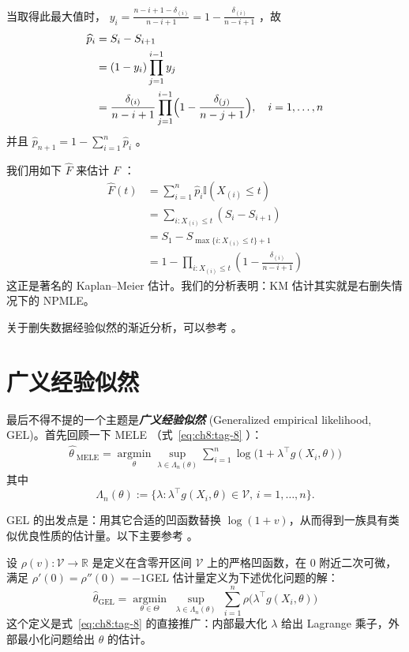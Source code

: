当取得此最大值时， $y_i=\frac{n-i+1-\delta_{(i)}}{n-i+1}=1-\frac{\delta_{(i)}}{n-i+1}$ ，故
\[\begin{aligned} \widehat p_i&=S_{i}-S_{i+1}\\ &=(1-y_i)\prod_{j=1}^{i-1}y_j\\ &= \frac{\delta_{(i)}}{n-i+1} \prod_{j=1}^{i-1} \Bigl( 1 - \frac{\delta_{(j)}}{n-j+1} \Bigr),\quad i = 1,\ldots,n \end{aligned}\]
并且 $\widehat p_{n+1}=1-\sum_{i=1}^n\widehat p_i$ 。

我们用如下 $\widehat F$ 来估计 $F$ ：
\[\begin{aligned} \widehat{F}(t) &= \sum_{i=1}^{n} \widehat{p}_i \mathbb I(X_{(i)} \le t)\\ &=\sum_{i:X_{(i)}\le t}(S_{i}-S_{i+1})\\ &=S_1-S_{\max\{i:X_{(i)}\le t\}+1}\\ &=1 - \prod_{i: X_{(i)}\le t} \left(1-\frac{\delta_{(i)}}{n-i+1}\right) \end{aligned}\]
这正是著名的 Kaplan--Meier 估计。我们的分析表明：KM 估计其实就是右删失情况下的 NPMLE。

关于删失数据经验似然的渐近分析，可以参考 \cite{wangjing2001}。

\section{广义经验似然}

最后不得不提的一个主题是\textbf{\emph{广义经验似然 }} (Generalized empirical likelihood, GEL)。首先回顾一下 MELE （式~\eqref{eq:ch8:tag-8} ）：
\[\begin{aligned} \widehat{\theta\ }_{\text{MELE}}=\operatorname*{\arg\min}_\theta\sup_{\lambda\in\Lambda_n(\theta)}\sum_{i=1}^n\log\big(1+\lambda^\top g(X_i,\theta)\big) \end{aligned}\]
其中
\[
\Lambda_n(\theta):=\{\lambda:\lambda^\top g(X_i,\theta)\in\mathcal{V},\, i=1,\dots,n\}.
\]

GEL 的出发点是：用其它合适的凹函数替换 $\log(1+v)$，从而得到一族具有类似优良性质的估计量。以下主要参考 \cite{neweysmith2004}。

设 $\rho(v):\mathcal V\to \mathbb {R}$ 是定义在含零开区间 $\mathcal{V}$ 上的严格凹函数，在 0 附近二次可微，满足 $\rho'(0)=\rho''(0)=-1$GEL 估计量定义为下述优化问题的解：
\[\widehat{\theta}_{\mathrm{GEL}} = \operatorname*{\arg\min}_{\theta\in\Theta}\;\sup_{\lambda\in\Lambda_n(\theta)}\; \sum_{i=1}^n \rho\bigl(\lambda^\top g(X_i,\theta)\bigr)\]
这个定义是式~\eqref{eq:ch8:tag-8} 的直接推广：内部最大化 $\lambda$ 给出 Lagrange 乘子，外部最小化问题给出 $\theta$ 的估计。

